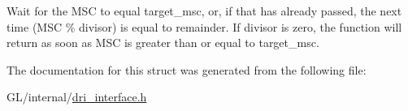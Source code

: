 Wait for the M\+SC to equal target\+\_\+msc, or, if that has already passed, the next time (M\+SC \% divisor) is equal to remainder. If divisor is zero, the function will return as soon as M\+SC is greater than or equal to target\+\_\+msc. 

The documentation for this struct was generated from the following file\+:\begin{DoxyCompactItemize}
\item 
G\+L/internal/\hyperlink{dri__interface_8h}{dri\+\_\+interface.\+h}\end{DoxyCompactItemize}
